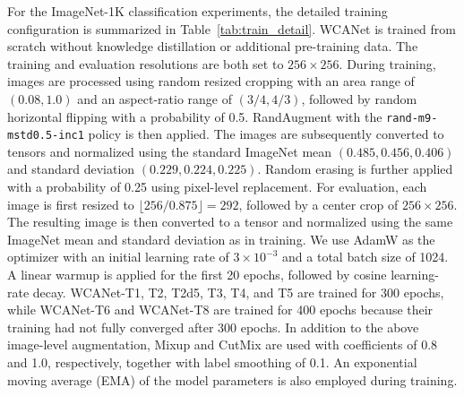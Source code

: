 \documentclass[a4paper,fleqn]{cas-dc}
\begin{document}
For the ImageNet-1K classification experiments, the detailed training
configuration is summarized in Table~\ref{tab:train_detail}. WCANet is trained
from scratch without knowledge distillation or additional pre-training data.
The training and evaluation resolutions are both set to $256\times256$.
{\color{blue}
During training, images are processed using random resized cropping with an
area range of $(0.08, 1.0)$ and an aspect-ratio range of $(3/4, 4/3)$,
followed by random horizontal flipping with a probability of 0.5.
RandAugment with the \texttt{rand-m9-mstd0.5-inc1} policy is then applied.
The images are subsequently converted to tensors and normalized using the
standard ImageNet mean $(0.485, 0.456, 0.406)$ and standard deviation
$(0.229, 0.224, 0.225)$. Random erasing is further applied with a probability
of 0.25 using pixel-level replacement.
}
{\color{blue}
For evaluation, each image is first resized to
$\lfloor 256/0.875 \rfloor = 292$, followed by a center crop of
$256\times256$. The resulting image is then converted to a tensor and
normalized using the same ImageNet mean and standard deviation as in training.
}
We use AdamW as the optimizer with an initial learning rate of
$3\times10^{-3}$ and a total batch size of 1024. A linear warmup is applied
for the first 20 epochs, followed by cosine learning-rate decay.
WCANet-T1, T2, T2d5, T3, T4, and T5 are trained for 300 epochs, while
WCANet-T6 and WCANet-T8 are trained for 400 epochs because their training
had not fully converged after 300 epochs.
In addition to the above image-level augmentation, Mixup and CutMix are used
with coefficients of 0.8 and 1.0, respectively, together with label smoothing
of 0.1. An exponential moving average (EMA) of the model parameters is also
employed during training.
\end{document}
